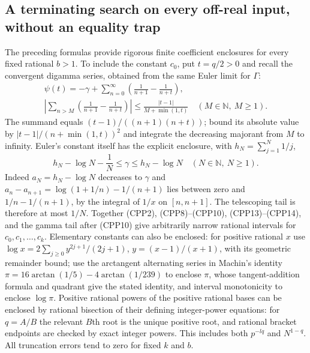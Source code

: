 \subsection{A terminating search on every off-real input, without an equality trap}

The preceding formulas provide rigorous finite coefficient
enclosures for every fixed rational $b>1$. To include the
constant $c_0$, put $t=q/2>0$ and recall the convergent
digamma series, obtained from the same Euler limit for $\Gamma$:
\begin{equation}\tag{CPP13}\begin{gathered}
 \psi(t)=-\gamma+\sum_{n=0}^\infty
          \left(\frac1{n+1}-\frac1{n+t}\right),\\
 \left|\sum_{n>M}\left(\frac1{n+1}-\frac1{n+t}\right)\right|
       \le\frac{|t-1|}{M+\min(1,t)}
 \quad(M\in\mathbb N,\ M\ge1).\end{gathered}
\end{equation}
The summand equals $(t-1)/((n+1)(n+t))$; bound its absolute
value by $|t-1|/(n+\min(1,t))^2$ and integrate the decreasing
majorant from $M$ to infinity. Euler's constant itself has
the explicit enclosure, with $h_N=\sum_{j=1}^N1/j$,
\begin{equation}\tag{CPP14}
 h_N-\log N-\frac1N\le\gamma\le h_N-\log N
 \quad(N\in\mathbb N,\ N\ge1).
\end{equation}
Indeed $a_N=h_N-\log N$ decreases to $\gamma$ and
$a_n-a_{n+1}=\log(1+1/n)-1/(n+1)$ lies between zero and
$1/n-1/(n+1)$, by the integral of $1/x$ on $[n,n+1]$.
The telescoping tail is therefore at most $1/N$.
Together (CPP2), (CPP8)--(CPP10), (CPP13)--(CPP14), and the
gamma tail after (CPP10) give arbitrarily narrow rational
intervals for $c_0,c_1,\ldots,c_k$. Elementary constants can
also be enclosed: for positive rational $x$ use
$\log x=2\sum_{j\ge0}y^{2j+1}/(2j+1)$,
$y=(x-1)/(x+1)$, with its geometric remainder bound;
use the arctangent alternating series in Machin's identity
$\pi=16\arctan(1/5)-4\arctan(1/239)$ to enclose $\pi$,
whose tangent-addition formula and quadrant give the stated
identity, and interval monotonicity to enclose $\log\pi$.
Positive rational powers of the positive rational bases
can be enclosed by rational bisection of their defining
integer-power equations: for $q=A/B$ the relevant $B$th root
is the unique positive root, and rational bracket endpoints
are checked by exact integer powers. This includes both
$p^{-lq}$ and $N^{1-q}$. All truncation
errors tend to zero for fixed $k$ and $b$.

